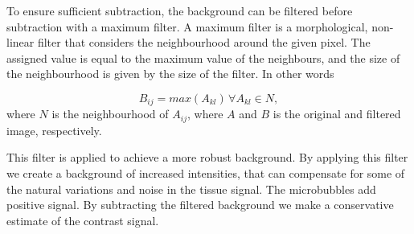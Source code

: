 To ensure sufficient subtraction, the background can be filtered before subtraction with a maximum filter. A maximum filter is a morphological, non-linear filter that considers the neighbourhood around the given pixel. The assigned value is equal to the maximum value of the neighbours, and the size of the neighbourhood is given by the size of the filter. In other words

\begin{equation}
B_{ij} = max(A_{kl})\, \forall A_{kl} \in N,
\end{equation}
where $N$ is the neighbourhood of $A_{ij}$, where $A$ and $B$ is the original and filtered image, respectively. 

This filter is applied to achieve a more robust background. By applying this filter we create a background of increased intensities, that can compensate for some of the natural variations and noise in the tissue signal. The microbubbles add positive signal. By subtracting the filtered background we make a conservative estimate of the contrast signal. 


%
%
%




\clearpage






